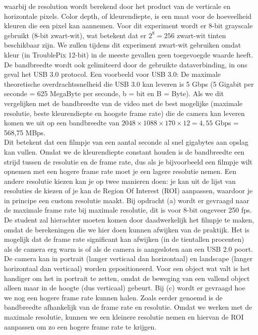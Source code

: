\documentclass{article}
\begin{document}
waarbij de resolution wordt berekend door het product van de verticale en horizontale pixels. Color depth, of kleurendiepte, is een maat voor de hoeveelheid kleuren die een pixel kan aannemen. Voor dit experiment wordt er 8-bit grayscale gebruikt (8-bit zwart-wit), wat betekent dat er $2^8=256$ zwart-wit tinten beschikbaar zijn. We zullen tijdens dit experiment zwart-wit gebruiken omdat kleur (in TroublePix 12-bit) in de meeste gevallen geen toegevoegde waarde heeft. De bandbreedte wordt ook gelimiteerd door de gebruikte dataverbinding, in ons geval het USB 3.0 protocol. Een voorbeeld voor USB 3.0: De maximale theoretische overdrachtssnelheid die USB 3.0 kan leveren is 5 Gbps (5 Gigabit per seconde = 625 MegaByte per seconde, b = bit en B = Byte). Als we dit vergelijken met de bandbreedte van de video met de best mogelijke (maximale resolutie, beste kleurendiepte en hoogste frame rate) die de camera kan leveren komen we uit op een bandbreedte van $2048 \times 1088 \times 170 \times 12 = 4,55$ Gbps = 568,75 MBps. \\Dit betekent dat een filmpje van een aantal seconde al snel gigabytes aan opslag kan vullen. Omdat we de kleurendiepte constant houden is de bandbreedte een strijd tussen de resolutie en de frame rate, dus als je bijvoorbeeld een filmpje wilt opnemen met een hogere frame rate moet je een lagere resolutie nemen. Een andere resolutie kiezen kan je op twee manieren doen: je kan uit de lijst van resoluties de kiezen of je kan de Region Of Interest (ROI) aanpassen, waardoor je in principe een custom resolutie maakt. Bij opdracht (a) wordt er gevraagd naar de maximale frame rate bij maximale resolutie, dit is voor 8-bit ongeveer 250 fps. De student zal hierachter moeten komen door daadwerkelijk het filmpje te maken, omdat de berekeningen die we hier doen kunnen afwijken van de praktijk. Het is mogelijk dat de frame rate significant kan afwijken (in de tientallen procenten) als de camera erg warm is of als de camera is aangesloten aan een USB 2.0 poort. De camera kan in portrait (langer verticaal dan horizontaal) en landscape (langer horizontaal dan verticaal) worden gepositioneerd. Voor een object wat valt is het handiger om het in portrait te zetten, omdat de beweging van een vallend object alleen maar in de hoogte (dus verticaal) gebeurt. Bij (c) wordt er gevraagd hoe we nog een hogere frame rate kunnen halen. Zoals eerder genoemd is de bandbreedte afhankelijk van de frame rate en resolutie. Omdat we werken met de maximale resolutie, kunnen we een kleinere resolutie nemen en hiervan de ROI aanpassen om zo een hogere frame rate te krijgen.
\end{document}
